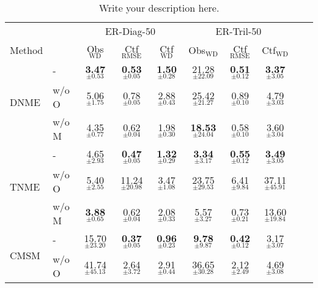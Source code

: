 
\begin{table}[t]
\caption{Write your description here.}
\label{sample-table}
\vskip 0.15in
\begin{center}
\begin{small}
\begin{sc}
\begin{tabular}{llcccccccc}
\toprule
 &  & \multicolumn{3}{c}{ER-Diag-50} & \multicolumn{3}{c}{ER-Tril-50} \\
      \cmidrule(lr){3-5}                \cmidrule(lr){6-8}
Method &  & Obs$_{\text{WD}}$ & Ctf$_{\text{RMSE}}$ & Ctf$_{\text{WD}}$ & Obs$_{\text{WD}}$ & Ctf$_{\text{RMSE}}$ & Ctf$_{\text{WD}}$ \\
\midrule
\multirow{3}{*}{DNME} & -     & \textbf{3.47}$_{\pm \mathbf{0.53}}$ & \textbf{0.53}$_{\pm \mathbf{0.05}}$ & \textbf{1.50}$_{\pm \mathbf{0.28}}$ & 21.28$_{\pm 22.09}$ & \textbf{0.51}$_{\pm \mathbf{0.12}}$ & \textbf{3.37}$_{\pm \mathbf{3.05}}$ & \\
                             & w/o O & 5.06$_{\pm 1.75}$ & 0.78$_{\pm 0.05}$ & 2.88$_{\pm 0.43}$ & 25.42$_{\pm 21.27}$ & 0.89$_{\pm 0.10}$ & 4.79$_{\pm 3.03}$ & \\
                             & w/o M & 4.35$_{\pm 0.77}$ & 0.62$_{\pm 0.04}$ & 1.98$_{\pm 0.30}$ & \textbf{18.53}$_{\pm \mathbf{24.04}}$ & 0.58$_{\pm 0.10}$ & 3.60$_{\pm 3.04}$ & \\
\midrule
\multirow{3}{*}{TNME} & -     & 4.65$_{\pm 2.93}$ & \textbf{0.47}$_{\pm \mathbf{0.05}}$ & \textbf{1.32}$_{\pm \mathbf{0.29}}$ & \textbf{3.34}$_{\pm \mathbf{3.17}}$ & \textbf{0.55}$_{\pm \mathbf{0.12}}$ & \textbf{3.49}$_{\pm \mathbf{3.05}}$ & \\
                             & w/o O & 5.40$_{\pm 2.55}$ & 11.24$_{\pm 20.98}$ & 3.47$_{\pm 1.08}$ & 23.75$_{\pm 29.53}$ & 6.41$_{\pm 9.84}$ & 37.11$_{\pm 45.91}$ & \\
                             & w/o M & \textbf{3.88}$_{\pm \mathbf{0.65}}$ & 0.62$_{\pm 0.04}$ & 2.08$_{\pm 0.33}$ & 5.57$_{\pm 3.27}$ & 0.73$_{\pm 0.21}$ & 13.60$_{\pm 19.84}$ & \\
\midrule
\multirow{4}{*}{CMSM} & -     & 15.70$_{\pm 23.20}$ & \textbf{0.37}$_{\pm \mathbf{0.05}}$ & \textbf{0.96}$_{\pm \mathbf{0.23}}$ & \textbf{9.78}$_{\pm \mathbf{9.87}}$ & \textbf{0.42}$_{\pm \mathbf{0.12}}$ & 3.17$_{\pm 3.07}$ & \\
                             & w/o O & 41.74$_{\pm 45.13}$ & 2.64$_{\pm 3.72}$ & 2.91$_{\pm 0.44}$ & 36.65$_{\pm 30.28}$ & 2.12$_{\pm 2.49}$ & 4.69$_{\pm 3.08}$ & \\

\end{tabular}
\end{sc}
\end{small}
\end{center}
\end{table}
